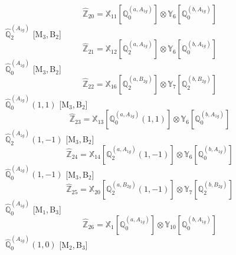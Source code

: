 \documentclass[fleqn,10pt,landscape]{article}
\begin{document}
\begin{itemize}
\begin{dmath*}
\hat{\mathbb{Z}}_{20}=\mathbb{X}_{11}[\mathbb{Q}_{0}^{(a,A_{1g})}] \otimes\mathbb{Y}_{6}[\mathbb{Q}_{0}^{(b,A_{1g})}]
\end{dmath*}
\vspace{4mm}
\noindent {} $\,\,\,\hat{\mathbb{Q}}_{2}^{(A_{1g})}$ [M$_{3}$,\,B$_{2}$]
\begin{dmath*}
\hat{\mathbb{Z}}_{21}=\mathbb{X}_{12}[\mathbb{Q}_{2}^{(a,A_{1g})}] \otimes\mathbb{Y}_{6}[\mathbb{Q}_{0}^{(b,A_{1g})}]
\end{dmath*}
\vspace{4mm}
\noindent {} $\,\,\,\hat{\mathbb{Q}}_{0}^{(A_{1g})}$ [M$_{3}$,\,B$_{2}$]
\begin{dmath*}
\hat{\mathbb{Z}}_{22}=\mathbb{X}_{16}[\mathbb{Q}_{2}^{(a,B_{2g})}] \otimes\mathbb{Y}_{7}[\mathbb{Q}_{2}^{(b,B_{2g})}]
\end{dmath*}
\vspace{4mm}
\noindent {} $\,\,\,\hat{\mathbb{Q}}_{0}^{(A_{1g})}(1,1)$ [M$_{3}$,\,B$_{2}$]
\begin{dmath*}
\hat{\mathbb{Z}}_{23}=\mathbb{X}_{13}[\mathbb{Q}_{0}^{(a,A_{1g})}(1,1)] \otimes\mathbb{Y}_{6}[\mathbb{Q}_{0}^{(b,A_{1g})}]
\end{dmath*}
\vspace{4mm}
\noindent {} $\,\,\,\hat{\mathbb{Q}}_{2}^{(A_{1g})}(1,-1)$ [M$_{3}$,\,B$_{2}$]
\begin{dmath*}
\hat{\mathbb{Z}}_{24}=\mathbb{X}_{14}[\mathbb{Q}_{2}^{(a,A_{1g})}(1,-1)] \otimes\mathbb{Y}_{6}[\mathbb{Q}_{0}^{(b,A_{1g})}]
\end{dmath*}
\vspace{4mm}
\noindent {} $\,\,\,\hat{\mathbb{Q}}_{0}^{(A_{1g})}(1,-1)$ [M$_{3}$,\,B$_{2}$]
\begin{dmath*}
\hat{\mathbb{Z}}_{25}=\mathbb{X}_{20}[\mathbb{Q}_{2}^{(a,B_{2g})}(1,-1)] \otimes\mathbb{Y}_{7}[\mathbb{Q}_{2}^{(b,B_{2g})}]
\end{dmath*}
\vspace{4mm}
\noindent {} $\,\,\,\hat{\mathbb{Q}}_{0}^{(A_{1g})}$ [M$_{1}$,\,B$_{3}$]
\begin{dmath*}
\hat{\mathbb{Z}}_{26}=\mathbb{X}_{1}[\mathbb{Q}_{0}^{(a,A_{1g})}] \otimes\mathbb{Y}_{10}[\mathbb{Q}_{0}^{(b,A_{1g})}]
\end{dmath*}
\vspace{4mm}
\noindent {} $\,\,\,\hat{\mathbb{Q}}_{0}^{(A_{1g})}(1,0)$ [M$_{2}$,\,B$_{3}$]
\begin{dmath*}

\end{dmath*}
\end{itemize}
\end{document}
